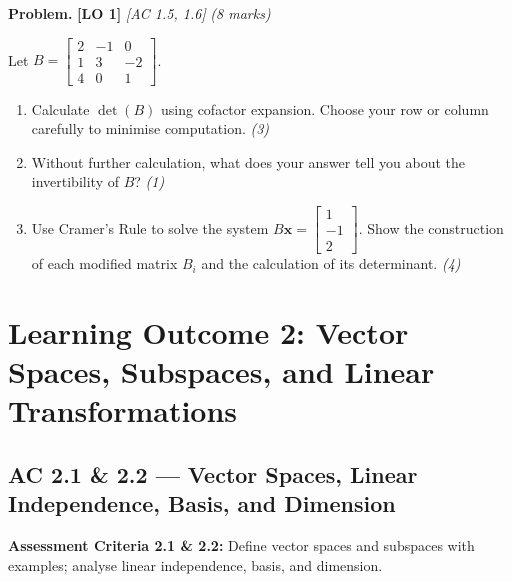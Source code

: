 \documentclass[12pt,a4paper]{article}
\newcommand{\lo}[1]{\textcolor{locolor}{\textbf{[LO #1]}}}
\newcommand{\ac}[1]{\textcolor{locolor}{\textit{[AC #1]}}}
\newcommand{\mat}[1]{\begin{bmatrix}#1\end{bmatrix}}
\begin{document}
	\begin{tcolorbox}[practice]
		\textbf{Problem.} \lo{1} \ac{1.5, 1.6} \hfill \textit{(8 marks)}
		
		Let $B = \mat{2 & -1 & 0 \\ 1 & 3 & -2 \\ 4 & 0 & 1}$.
		\begin{enumerate}[label=(\alph*)]
			\item Calculate $\det(B)$ using cofactor expansion. Choose your row or column carefully to minimise computation. \hfill\textit{(3)}
			\item Without further calculation, what does your answer tell you about the invertibility of $B$? \hfill\textit{(1)}
			\item Use Cramer's Rule to solve the system $B\mathbf{x} = \mat{1\\-1\\2}$.
			Show the construction of each modified matrix $B_i$ and the calculation of its determinant. \hfill\textit{(4)}
		\end{enumerate}
	\end{tcolorbox}
	
	\begin{tcolorbox}[answer]
	\end{tcolorbox}
	
	\newpage
	
	\section{Learning Outcome 2: Vector Spaces, Subspaces, and Linear Transformations}
	
	\subsection{AC 2.1 \& 2.2 — Vector Spaces, Linear Independence, Basis, and Dimension}
	
	\begin{tcolorbox}[subtopic]
		\textbf{Assessment Criteria 2.1 \& 2.2:} Define vector spaces and subspaces with examples;
		analyse linear independence, basis, and dimension.
	\end{tcolorbox}
	
\end{document}
